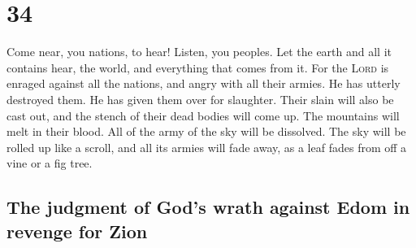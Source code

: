 \hypertarget{section-33}{%
\section{34}\label{section-33}}

 Come near, you nations, to hear! Listen, you peoples. Let
the earth and all it contains hear, the world, and everything that comes
from it.  For the \textsc{Lord} is enraged against all the
nations, and angry with all their armies. He has utterly destroyed them.
He has given them over for slaughter.  Their slain will
also be cast out, and the stench of their dead bodies will come up. The
mountains will melt in their blood.  All of the army of
the sky will be dissolved. The sky will be rolled up like a scroll, and
all its armies will fade away, as a leaf fades from off a vine or a fig
tree.

\hypertarget{the-judgment-of-gods-wrath-against-edom-in-revenge-for-zion}{%
\subsection{The judgment of God's wrath against Edom in revenge for
Zion}\label{the-judgment-of-gods-wrath-against-edom-in-revenge-for-zion}}

